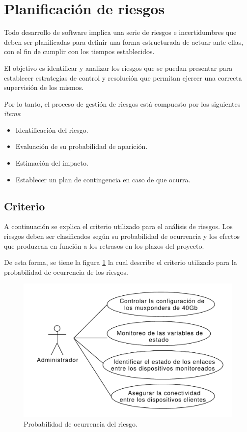 \section{Planificación de riesgos}
Todo desarrollo de software implica una serie de riesgos e incertidumbres que deben ser planificadas para definir una forma estructurada de actuar ante ellas, con el fin de cumplir con los tiempos establecidos.

El objetivo es identificar y analizar los riesgos que se puedan presentar para establecer estrategias de control y resolución que permitan ejercer una correcta supervisión de los mismos.

Por lo tanto, el proceso de gestión de riesgos está compuesto por los siguientes \textit{items}:

\begin{itemize}
	\item Identificación del riesgo.
  \item Evaluación de su probabilidad de aparición.
  \item Estimación del impacto.
  \item Establecer un plan de contingencia en caso de que ocurra.
\end{itemize}

\subsection{Criterio}
A continuación se explica el criterio utilizado para el análisis de riesgos. Los riesgos deben ser clasificados según su probabilidad de ocurrencia y los efectos que produzcan en función a los retrasos en los plazos del proyecto. 

De esta forma, se tiene la figura \ref{fig:probabilidad_riesgo} la cual describe el criterio utilizado para la probabilidad de ocurrencia de los riesgos.

\begin{figure}[H]
  \centering
  \includegraphics[scale=0.53]{Figures/caso_uso_admin.pdf}
  \caption{Probabilidad de ocurrencia del riesgo.}
  \label{fig:probabilidad_riesgo}
\end{figure}

